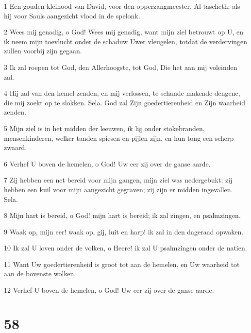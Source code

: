 \par 1 Een gouden kleinood van David, voor den opperzangmeester, Al-tascheth; als hij voor Sauls aangezicht vlood in de spelonk.
\par 2 Wees mij genadig, o God! Wees mij genadig, want mijn ziel betrouwt op U, en ik neem mijn toevlucht onder de schaduw Uwer vleugelen, totdat de verdervingen zullen voorbij zijn gegaan.
\par 3 Ik zal roepen tot God, den Allerhoogste, tot God, Die het aan mij voleinden zal.
\par 4 Hij zal van den hemel zenden, en mij verlossen, te schande makende dengene, die mij zoekt op te slokken. Sela. God zal Zijn goedertierenheid en Zijn waarheid zenden.
\par 5 Mijn ziel is in het midden der leeuwen, ik lig onder stokebranden, mensenkinderen, welker tanden spiesen en pijlen zijn, en hun tong een scherp zwaard.
\par 6 Verhef U boven de hemelen, o God! Uw eer zij over de ganse aarde.
\par 7 Zij hebben een net bereid voor mijn gangen, mijn ziel was nedergebukt; zij hebben een kuil voor mijn aangezicht gegraven; zij zijn er midden ingevallen. Sela.
\par 8 Mijn hart is bereid, o God! mijn hart is bereid; ik zal zingen, en psalmzingen.
\par 9 Waak op, mijn eer! waak op, gij, luit en harp! ik zal in den dageraad opwaken.
\par 10 Ik zal U loven onder de volken, o Heere! ik zal U psalmzingen onder de natien.
\par 11 Want Uw goedertierenheid is groot tot aan de hemelen, en Uw waarheid tot aan de bovenste wolken.
\par 12 Verhef U boven de hemelen, o God! Uw eer zij over de ganse aarde.

\chapter{58}

